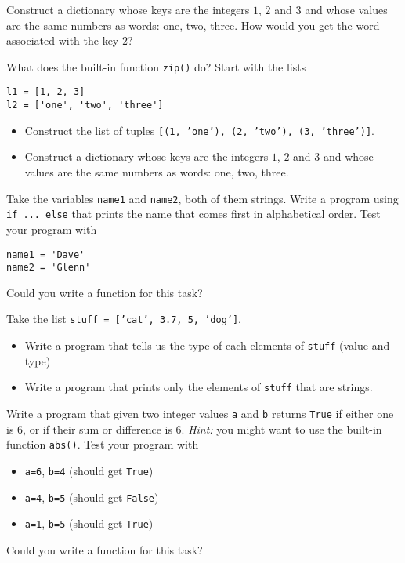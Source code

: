 \begin{questions}
\item Construct a dictionary whose keys are the integers $1$, $2$ and $3$ and whose values are the same numbers as words: one, two, three. How would you get the word associated with the key 2?

\item What does the built-in function \texttt{zip()} do? Start with the lists
\begin{verbatim}
l1 = [1, 2, 3]
l2 = ['one', 'two', 'three']
\end{verbatim}
\begin{itemize}
\item Construct the list of tuples \texttt{[(1, 'one'), (2, 'two'), (3, 'three')]}.
\item Construct a dictionary whose keys are the integers $1$, $2$ and $3$ and whose values are the same numbers as words: one, two, three.
\end{itemize}

\item Take the variables \texttt{name1} and \texttt{name2}, both of them strings. Write a program using \texttt{if ... else} that prints the name that comes first in alphabetical order. Test your program with
\begin{verbatim}
name1 = 'Dave'
name2 = 'Glenn'
\end{verbatim}
Could you write a function for this task?

\item Take the list \texttt{stuff = ['cat', 3.7, 5, 'dog']}.
\begin{itemize}
\item Write a program that tells us the type of each elements of \texttt{stuff} (value and type)
\item Write a program that prints only the elements of \texttt{stuff} that are strings.
\end{itemize}


\item Write a program that given two integer values \texttt{a} and \texttt{b} returns \texttt{True} if either one is $6$, or if their sum or difference is $6$. \emph{Hint:} you might want to use the built-in function \texttt{abs()}. Test your program with
\begin{itemize}
\item \texttt{a=6}, \texttt{b=4} (should get \texttt{True})
\item \texttt{a=4}, \texttt{b=5} (should get \texttt{False})
\item \texttt{a=1}, \texttt{b=5} (should get \texttt{True})
\end{itemize}
Could you write a function for this task?



\end{questions}
